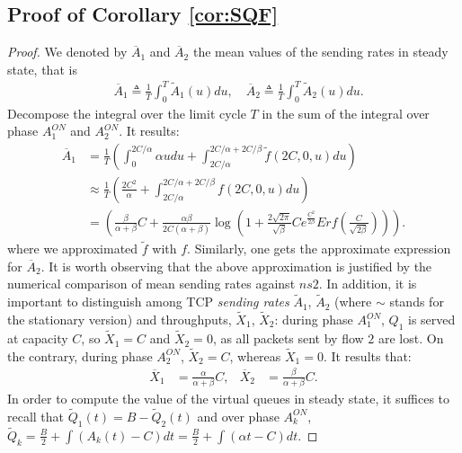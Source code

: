 \documentclass[a4paper,oneside, 11pt]{article}
\begin{document}
\begin{appendix}
\section{Proof of Corollary \ref{cor:SQF}}\label{app:3}
\begin{proof}
We denoted by $\overline{A}_1$ and $\overline{A}_2$ the mean values of the sending rates in steady state, that is
\begin{align}\label{def:mean_sending_rates_SQF}
&\overline{A}_1 \triangleq \frac{1}{T} \int_0^T \widetilde{A}_1(u) du, \quad \overline{A}_2 \triangleq \frac{1}{T} \int_0^T \widetilde{A}_2(u) du.
\end{align}
Decompose the integral over the limit cycle $T$ in the sum of the integral over phase $A_1^{ON}$ and $A_2^{ON}$.
It results:
\begin{align}\label{eq:mean_sending_rates_SQF}
\overline{A}_1 &= \frac{1}{T}\left( \int_0^{2C/\alpha}\alpha u du+ \int_{2C/\alpha}^{2C/\alpha+2C/\beta}\widetilde{f}(2C,0,u)du \right)\\
&\approx \frac{1}{T}\left(\frac{2C^2}{\alpha}+ \int_{2C/\alpha}^{2C/\alpha+2C/\beta} f(2C,0,u)du \right) \nonumber \\
&= \left(\frac{\beta}{\alpha+\beta}C+\frac{\alpha\beta}{2C(\alpha+\beta)}\log\left(1+\frac{2\sqrt{2\pi}}{\sqrt{\beta}}C e^{\frac{C^2}{2\beta}}Erf\left(\frac{C}{\sqrt{2\beta}}\right)\right)\right).\nonumber
\end{align}
where we approximated $\widetilde f$ with $f$.
Similarly, one gets the approximate expression for $\overline{A}_2$.
It is worth observing that the above approximation is justified by the numerical comparison of mean sending rates against $ns2$.
In addition, it is important to distinguish among TCP \textit{sending rates} $\widetilde{A}_1$, $\widetilde{A}_2$ (where $\sim$ stands for the stationary version) and throughputs, $\widetilde{X}_1$, $\widetilde{X}_2$:
during phase $A_1^{ON}$, $Q_1$ is served at capacity $C$, so $\widetilde{X}_1=C$ and $\widetilde{X}_2=0$, as all packets sent by flow $2$ are lost.
On the contrary, during phase $A_2^{ON}$, $\widetilde{X}_2=C$, whereas $\widetilde{X}_1=0$.
It results that:
\begin{align*}\overline{X}_1 &= \frac{\alpha}{\alpha+\beta}C, &\overline{X}_2 &= \frac{\beta}{\alpha+\beta}C.
\end{align*}
In order to compute the value of the virtual queues in steady state, it suffices to recall that $\widetilde{Q}_1(t)=B-\widetilde{Q}_2(t)$ and over phase $A_k^{ON}$, $\widetilde{Q}_k=\frac{B}{2}+\int (A_k(t)-C)dt=\frac{B}{2}+\int (\alpha t-C)dt$.

\end{proof}
\end{appendix}
\end{document}
